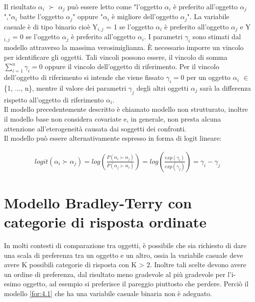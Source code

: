 Il risultato $\alpha_{i}$ $\succ$ $\alpha_{j}$ può essere letto come "l'oggetto $\alpha_{i}$ è preferito all'oggetto $\alpha_{j}$","$\alpha_{i}$ batte l'oggetto $\alpha_{j}$" oppure "$\alpha_{i}$ è migliore dell'oggetto $\alpha_{j}$". La variabile casuale è di tipo binario cioè Y$_{i,j}$ = 1 se l'oggetto $\alpha_{i}$ è preferito all'oggetto $\alpha_{j}$ e Y$_{i,j}$ = 0 se l'oggetto $\alpha_{j}$ è preferito all'oggetto $\alpha_{i}$. I parametri $\gamma_{i}$ sono stimati dal modello attraverso la massima verosimiglianza.
È necessario imporre un vincolo per identificare gli oggetti. Tali vincoli possono essere, il vincolo di somma $ \sum_{i=1}^{n} \gamma_{i} = 0 $ oppure il vincolo dell'oggetto di riferimento.
Per il vincolo dell'oggetto di riferimento si intende che viene fissato $\gamma_{i} = 0$ per un oggetto $\alpha_{i}$ $\in$ \{1, ..., n\}, mentre il valore dei parametri $\gamma_{j}$ degli altri oggetti $\alpha_{j}$ sarà la differenza rispetto all'oggetto di riferimento $\alpha_{i}$.\\
Il modello precedentemente descritto è chiamato modello non strutturato, inoltre il modello base non considera covariate e, in generale, non presta alcuna attenzione all'eterogeneità causata dai soggetti dei confronti.\\

Il modello può essere alternativamente espresso in forma di logit lineare:

\begin{align}
		logit(\alpha_{i} \succ \alpha_{j}) =  log\left( \frac{P( \alpha_{i} \succ \alpha_{j})}{P( \alpha_{j} \succ \alpha_{i})} \right) = log\left(\frac{exp(\gamma_{i})}{exp(\gamma_{j})}\right) = \gamma_i - \gamma_j \label{for:4.1}
\end{align}


\section{Modello Bradley-Terry con categorie di risposta ordinate}\label{sez:4.2}
In molti contesti di comparazione tra oggetti, è possibile che sia richiesto di dare una scala di preferenza tra un oggetto e un altro, ossia la variabile casuale deve avere K possibili categorie di risposta con K > 2. Inoltre tali scelte devono avere un ordine di preferenza, dal risultato meno gradevole al più gradevole per l'i-esimo oggetto, ad esempio si preferisce il pareggio piuttosto che perdere. Perciò il modello \ref{for:4.1} che ha una variabile casuale binaria non è adeguato. 

